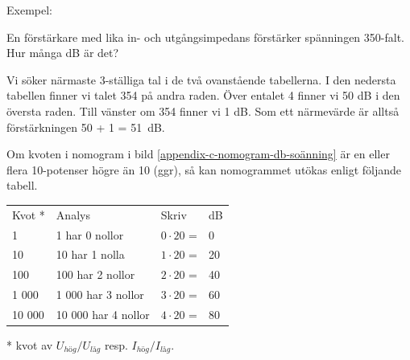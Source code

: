\begin{rev-raderas}

Exempel:

En förstärkare med lika in- och utgångsimpedans förstärker spänningen
350-falt.  Hur många dB är det?

Vi söker närmaste 3-ställiga tal i de två ovanstående tabellerna. I
den nedersta tabellen finner vi talet 354 på andra raden.  Över
entalet 4 finner vi 50 dB i den översta raden. Till vänster om 354
finner vi 1 dB.  Som ett närmevärde är alltså förstärkningen 50 + 1 =
51~dB.

Om kvoten i nomogram i bild \ref{appendix-c-nomogram-db-soänning} är en eller flera 10-potenser högre
än 10 (ggr), så kan nomogrammet utökas enligt följande tabell.

\begin{tabular}{llll}
  Kvot * & Analys              & Skriv           & dB \\
  1      & 1 har 0 nollor      & \(0 \cdot 20\) = & 0  \\
  10     & 10 har 1 nolla      & \(1 \cdot 20\) = & 20 \\
  100    & 100 har 2 nollor    & \(2 \cdot 20\) = & 40 \\
  1 000  & 1 000 har 3 nollor  & \(3 \cdot 20\) = & 60 \\
  10 000 & 10 000 har 4 nollor & \(4 \cdot 20\) = & 80 \\
\end{tabular}

* kvot av \(U_{hög}/U_{låg}\) resp. \(I_{hög}/I_{låg}\).


\end{rev-raderas}
